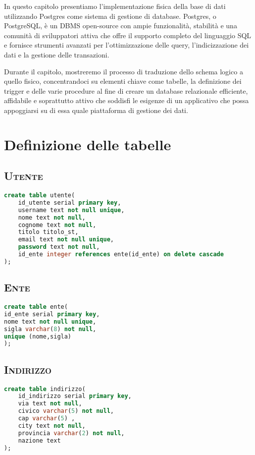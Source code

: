 In questo capitolo presentiamo l'implementazione fisica della base di dati utilizzando Postgres come sistema di gestione di database. Postgres, o PostgreSQL, è un DBMS open-source con ampie funzionalità, stabilità e una comunità di sviluppatori attiva che offre il supporto completo del linguaggio SQL e fornisce strumenti avanzati per l'ottimizzazione delle query, l'indicizzazione dei dati e la gestione delle transazioni. 
\bigskip

Durante il capitolo, mostreremo il processo di traduzione dello schema logico a quello fisico, concentrandoci su elementi chiave come tabelle, la definizione dei trigger e delle varie procedure al fine di creare un database relazionale efficiente, affidabile e soprattutto attivo che soddisfi le esigenze di un applicativo che possa appoggiarsi su di essa quale piattaforma di gestione dei dati.
\section{Definizione delle tabelle}
\subsection{\textsc{Utente}}

\begin{lstlisting}[language=SQL,style=mystyle,caption={Tabella: Utente}]
create table utente(
    id_utente serial primary key,
    username text not null unique,
    nome text not null,
    cognome text not null,
    titolo titolo_st,
    email text not null unique,
    password text not null,
    id_ente integer references ente(id_ente) on delete cascade
);
\end{lstlisting}
\subsection{\textsc{Ente}}
\begin{lstlisting}[language=SQL,style=mystyle,caption={Tabella: Ente}]
create table ente(
id_ente serial primary key,
nome text not null unique,
sigla varchar(8) not null,
unique (nome,sigla)
);
\end{lstlisting}
\subsection{\textsc{Indirizzo}}
\begin{lstlisting}[language=SQL,style=mystyle,caption={Tabella: Indirizzo}]
create table indirizzo(
    id_indirizzo serial primary key,
    via text not null,
    civico varchar(5) not null,
    cap varchar(5) ,
    city text not null,
    provincia varchar(2) not null,
    nazione text
);
\end{lstlisting}
